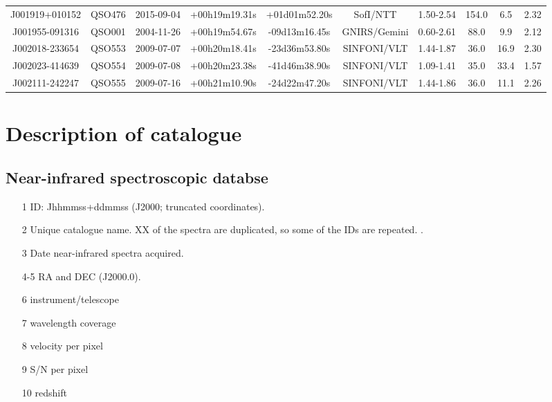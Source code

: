 \begin{landscape}
\begin{minipage}{\linewidth}
\begin{tabular}{cccccccccc}
    J001919+010152  &  QSO476 & 2015-09-04 &  +00h19m19.31s &  +01d01m52.20s &         SofI/NTT &  1.50-2.54 &     154.0 &   6.5 &  2.32 \\
    J001955-091316  &  QSO001 & 2004-11-26 &  +00h19m54.67s &  -09d13m16.45s &     GNIRS/Gemini &  0.60-2.61 &      88.0 &   9.9 &  2.12 \\
    J002018-233654  &  QSO553 & 2009-07-07 &  +00h20m18.41s &  -23d36m53.80s &      SINFONI/VLT &  1.44-1.87 &      36.0 &  16.9 &  2.30 \\
    J002023-414639  &  QSO554 & 2009-07-08 &  +00h20m23.38s &  -41d46m38.90s &      SINFONI/VLT &  1.09-1.41 &      35.0 &  33.4 &  1.57 \\
    J002111-242247  &  QSO555 & 2009-07-16 &  +00h21m10.90s &  -24d22m47.20s &      SINFONI/VLT &  1.44-1.86 &      36.0 &  11.1 &  2.26 \\
    \bottomrule
    \end{tabular}
    \end{minipage}
\end{landscape}

\section{Description of catalogue}

\subsection{Near-infrared spectroscopic databse}

\begin{itemize}

\item[1] ID: Jhhmmss+ddmmss (J2000; truncated coordinates). 

\item[2] Unique catalogue name. XX of the spectra are duplicated, so some of the IDs are repeated. . 

\item[3] Date near-infrared spectra acquired. 

\item[4-5] RA and DEC (J2000.0).  

\item[6] instrument/telescope

\item[7] wavelength coverage

\item[8] velocity per pixel

\item[9] S/N per pixel

\item[10] redshift

\end{itemize}

